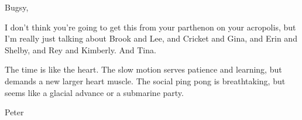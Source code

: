 

Bugsy,

I don't think you're going to get this from your parthenon on your
acropolis, but I'm really just talking about Brook and Lee, and
Cricket and Gina, and Erin and Shelby, and Rey and Kimberly.  And
Tina.

The time is like the heart.  The slow motion serves patience and
learning, but demands a new larger heart muscle.  The social ping pong
is breathtaking, but seems like a glacial advance or a submarine
party.

Peter


\bye
